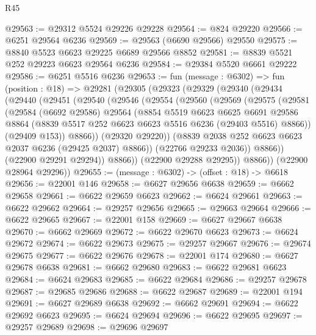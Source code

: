\begin{lexlean}{R45}
\begin{coremodule}
{@29563 := @29312 @5524 @29226 @29228
@29564 := @824 @29220
@29566 := @6251 @29564 @6236
@29569 := @29563 (@6690 @29566) @29550
@29575 := @8840 @5523 @6623 @29225 @6689 @29566 @8852
@29581 := @8839 @5521 @252 @29223 @6623 @29564 @6236
@29584 := @29384 @5520 @6661 @29222
@29586 := @6251 @5516 @6236
@29653 := fun (message : @6302) =>
  fun (position : @18) =>
  @29281
    (@29305
      (@29323
        (@29329
          (@29340
            (@29434
              (@29440
                (@29451
                  (@29540
                    (@29546
                      (@29554
                        (@29560
                          (@29569
                            (@29575
                              (@29581
                                (@29584
                                  (@6692 @29586)
                                  @29564
                                  (@8854
                                    @5519
                                    @6623
                                    @6625
                                    @6691
                                    @29586
                                    @8864
                                    (@8839 @5517 @252 @6623 @6623 @5516 @6236 (@29403 @5516) @8866))
                                  (@29409 @153))
                                @8866))
                            (@29320 @29220))
                          (@8839 @2038 @252 @6623 @6623 @2037 @6236 (@29425 @2037) @8866))
                        (@22766 @29233 @2036))
                      @8866))
                  (@22900 @29291 @29294))
                @8866))
            (@22900 @29288 @29295))
          @8866))
      (@22900 @28964 @29296))
@29655 := (message : @6302) -> (offset : @18) -> @6618
@29656 := @22001 @146
@29658 := @6627 @29656 @6638
@29659 := @6662 @29658
@29661 := @6622 @29659 @6623
@29662 := @6624 @29661
@29663 := @6622 @29662
@29664 := @29257 @29656
@29665 := @29663 @29664
@29666 := @6622 @29665
@29667 := @22001 @158
@29669 := @6627 @29667 @6638
@29670 := @6662 @29669
@29672 := @6622 @29670 @6623
@29673 := @6624 @29672
@29674 := @6622 @29673
@29675 := @29257 @29667
@29676 := @29674 @29675
@29677 := @6622 @29676
@29678 := @22001 @174
@29680 := @6627 @29678 @6638
@29681 := @6662 @29680
@29683 := @6622 @29681 @6623
@29684 := @6624 @29683
@29685 := @6622 @29684
@29686 := @29257 @29678
@29687 := @29685 @29686
@29688 := @6622 @29687
@29689 := @22001 @194
@29691 := @6627 @29689 @6638
@29692 := @6662 @29691
@29694 := @6622 @29692 @6623
@29695 := @6624 @29694
@29696 := @6622 @29695
@29697 := @29257 @29689
@29698 := @29696 @29697
}
\end{coremodule}
\end{lexlean}
